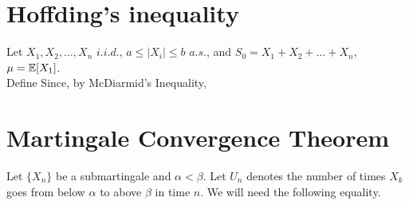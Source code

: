 \documentclass[all-lectures.tex]{subfiles}
\begin{document}
\section*{Hoffding's inequality}
Let $X_1, X_2, \dots, X_n$ $i.i.d.$, $a \le |X_i| \le b$ $a.s.$, and $S_0 = X_1 + X_2 + \dots + X_n$, $\mu = \mathbb{E}[X_1]$.\\
Define
Since,
by McDiarmid's Inequality,

\section{Martingale Convergence Theorem}

Let $\{X_n\}$ be a submartingale and $\alpha < \beta$. 
Let $U_n$ denotes the number of times $X_k$ goes from below $\alpha$ to above $\beta$ in time $n$. We will need the following equality.

\begin{lem}
\end{lem}
\end{document}
